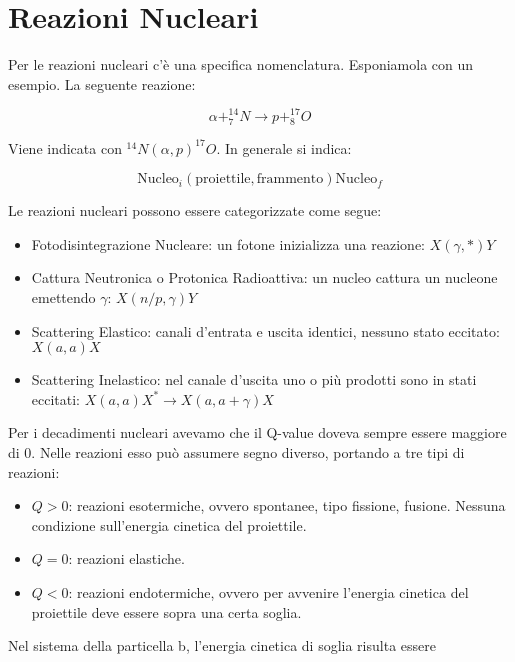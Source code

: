 \chapter{Reazioni Nucleari}

Per le reazioni nucleari c'è una specifica nomenclatura. Esponiamola con un esempio. La seguente reazione:

\begin{equation}
\alpha+^{14}_7N \longrightarrow p+^{17}_8O
\end{equation}

Viene indicata con $^{14}N(\alpha,p)^{17}O$. In generale si indica:

\begin{equation}
\text{Nucleo}_i(\text{proiettile},\text{frammento})\text{Nucleo}_f
\end{equation}

Le reazioni nucleari possono essere categorizzate come segue:

\begin{itemize}
\item Fotodisintegrazione Nucleare: un fotone inizializza una reazione: $X(\gamma,*)Y$
\item Cattura Neutronica o Protonica Radioattiva: un nucleo cattura un nucleone emettendo $\gamma$: $X(n/p,\gamma)Y$
\item Scattering Elastico: canali d'entrata e uscita identici, nessuno stato eccitato: $X(a,a)X$
\item Scattering Inelastico: nel canale d'uscita uno o più prodotti sono in stati eccitati: $X(a,a)X^* \rightarrow X(a,a+\gamma)X$
\end{itemize}

Per i decadimenti nucleari avevamo che il Q-value doveva sempre essere maggiore di 0. Nelle reazioni esso può assumere segno diverso, portando a tre tipi di reazioni:

\begin{itemize}
\item $Q>0$: reazioni esotermiche, ovvero spontanee, tipo fissione, fusione. Nessuna condizione sull'energia cinetica del proiettile.
\item $Q=0$: reazioni elastiche.
\item $Q<0$: reazioni endotermiche, ovvero per avvenire l'energia cinetica del proiettile deve essere sopra una certa soglia.
\end{itemize}

Nel sistema della particella b, l'energia cinetica di soglia risulta essere

